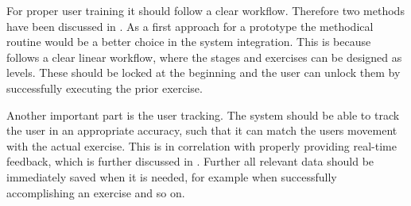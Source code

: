 For proper user training it should follow a clear workflow. Therefore two methods have been discussed in \textbf{}. As a first approach for a prototype the methodical routine would be a better choice in the system integration. This is because follows a clear linear workflow, where the stages and exercises can be designed as levels. These should be locked at the beginning and the user can unlock them by successfully executing the prior exercise.

Another important part is the user tracking. The system should be able to track the user in an appropriate accuracy, such that it can match the users movement with the actual exercise. This is in correlation with properly providing real-time feedback, which is further discussed in \textbf{}. Further all relevant data should be immediately saved when it is needed, for example when successfully accomplishing an exercise and so on.

\begin{comment}
- System should be able to track user appropriately
- All relevant data should be immediately saved when it is needed (unlocking exercise/stage, failing/accomplish exercise)
- Information about where the user currently is should be given --> title
- User selection
- Also a possibility to go to the last screen if she misclicks should be given.
\end{comment}